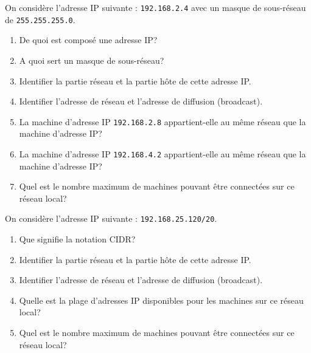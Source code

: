 \documentclass[11pt, a4paper]{report}
\begin{document}
\def\level{Premiere}  %
\def\course{NSI}
\def\chaptername{Les réseaux -- Adresses IP} %
\def\docname{ARSE05~--~TD 1}        %

\pagestyle{DS_LP}

\NomPrenom{}

\begin{exercice_cours}{}
    
On considère l'adresse IP suivante : \texttt{192.168.2.4} avec un masque de sous-réseau de \texttt{255.255.255.0}.
    \begin{enumerate}
        \item De quoi est composé une adresse IP? \hfill
        \item A quoi sert un masque de sous-réseau? 
        \item  Identifier la partie réseau et la partie hôte de cette adresse IP. \hfill
        \item Identifier l'adresse de réseau et l'adresse de diffusion (broadcast). \hfill
        \item La machine d'adresse IP \texttt{192.168.2.8} appartient-elle au même réseau que la machine d'adresse IP?
        \item La machine d'adresse IP \texttt{192.168.4.2} appartient-elle au même réseau que la machine d'adresse IP?
        \item Quel est le nombre maximum de machines pouvant être connectées sur ce réseau local? \hfill
    \end{enumerate}
\end{exercice_cours}

\begin{exercice_cours}{}

    On considère l'adresse IP suivante : \texttt{192.168.25.120/20}.
    \begin{enumerate}
        \item Que signifie la notation CIDR? \hfill
        \item Identifier la partie réseau et la partie hôte de cette adresse IP. \hfill
        \item Identifier l'adresse de réseau et l'adresse de diffusion (broadcast). \hfill
        \item Quelle est la plage d'adresses IP disponibles pour les machines sur ce réseau local? \hfill
        \item Quel est le nombre maximum de machines pouvant être connectées sur ce réseau local? \hfill
    \end{enumerate}
\end{exercice_cours}
\end{document}
